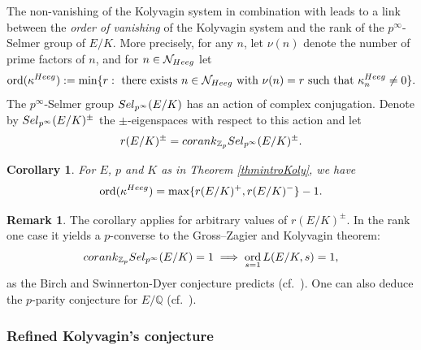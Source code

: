 \documentclass[10pt,reqno]{amsart}
\numberwithin{equation}{section}
\theoremstyle{plain}
\theoremstyle{definition}
\newtheorem*{rmk-intro}{Remark}
\theoremstyle{definition}
\theoremstyle{plain}
\theoremstyle{plain}
\theoremstyle{plain}
\theoremstyle{plain}
\theoremstyle{plain}
\theoremstyle{plain}
\newtheorem{corintro}{Corollary}
\DeclareMathOperator{\ord}{ord}
\newcommand{\Z}{\mathbb{Z}}
\newcommand{\Q}{\mathbb{Q}}
\begin{document}
The non-vanishing of the Kolyvagin system in 
 combination with \cite[Theorem 4]{kolystructure} 
 leads to a link between the \emph{order of vanishing} of the Kolyvagin system and the rank of the $p^{\infty}$-Selmer group of $E/K$. More precisely, for any $n$, let $\nu(n)$ denote the number of prime factors of $n$, and 
for $n\in\mathcal{N}_{\rm Heeg}$ 
let
\[
\ord(\kappa^{\rm Heeg}):= \min \{r: \text{ there exists }n\in \mathcal{N}_{\rm Heeg} \text{ with } \nu(n)=r \text{ such that }\kappa_n^{\rm Heeg}\neq 0\}.
\]
 The $p^\infty$-Selmer group ${\rm Sel}_{p^{\infty}}(E/K)$ 
  has an action of complex conjugation. Denote by ${\rm Sel}_{p^{\infty}}(E/K)^\pm$ the $\pm$-eigenspaces with respect to this action and let 
$$r(E/K)^{\pm}= {\rm corank}_{\Z_p}{\rm Sel}_{p^{\infty}}(E/K)^\pm.$$
\begin{corintro}\label{corA}
For $E$, $p$ and $K$ as in Theorem \ref{thmintroKoly}, we have
\[
\ord(\kappa^{\rm Heeg})= \max\{r(E/K)^+,r(E/K)^-\} -1.
\]
\end{corintro}

\begin{rmk-intro} 
The corollary applies for arbitrary values of $r(E/K)^\pm$. In the rank one case 
it yields a $p$-converse to the Gross--Zagier and Kolyvagin theorem:
$$
{\rm corank}_{\Z_{p}}{\rm Sel}_{p^{\infty}}(E/K)=1 \implies \ord_{s=1}L(E/K,s)=1,
$$
as the Birch and Swinnerton-Dyer conjecture predicts (cf.~\cite[Theorem 1.3]{zhang_ind}).  One can also deduce the $p$-parity conjecture for $E/\Q$ (cf.~\cite[Theorem 1.2, Remark 1]{zhang_ind}).
\end{rmk-intro}

\subsubsection*{Refined Kolyvagin's conjecture} 
\end{document}
